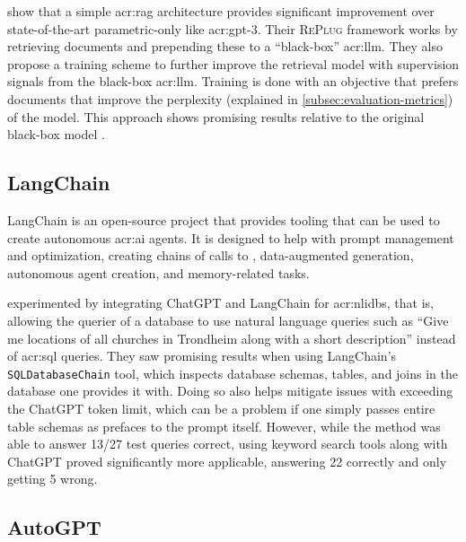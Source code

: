 \cite{shiREPLUGRetrievalAugmentedBlackBox2023} show that a simple \gls{acr:rag} architecture provides significant improvement over state-of-the-art parametric-only  like \acrshort{acr:gpt}-3. Their \textsc{RePlug} framework works by retrieving documents and prepending these to a \enquote{black-box} \acrshort{acr:llm}. They also propose a training scheme to further improve the retrieval model with supervision signals from the black-box \acrshort{acr:llm}. Training is done with an objective that prefers documents that improve the perplexity (explained in \autoref{subsec:evaluation-metrics}) of the model. This approach shows promising results relative to the original black-box model \citep[5-6]{shiREPLUGRetrievalAugmentedBlackBox2023}.

\subsection{LangChain}\label{subsubsec:langchain}

LangChain \citep{chaseLangChain2022} is an open-source project that provides tooling that can be used to create autonomous \acrshort{acr:ai} agents. It is designed to help with prompt management and optimization, creating chains of calls to , data-augmented generation, autonomous agent creation, and memory-related tasks.

\cite{nascimentoFamilyNaturalLanguage2023} experimented by integrating ChatGPT and LangChain for \glspl{acr:nlidb}, that is, allowing the querier of a database to use natural language queries such as \enquote{Give me locations of all churches in Trondheim along with a short description} instead of \acrshort{acr:sql} queries. They saw promising results when using LangChain's \texttt{SQLDatabaseChain} tool, which inspects database schemas, tables, and joins in the database one provides it with. Doing so also helps mitigate issues with exceeding the ChatGPT token limit, which can be a problem if one simply passes entire table schemas as prefaces to the prompt itself. However, while the method was able to answer 13/27 test queries correct, using keyword search tools along with ChatGPT proved significantly more applicable, answering 22 correctly and only getting 5 wrong.

\subsection{AutoGPT}\label{subsubsec:autogpt}

